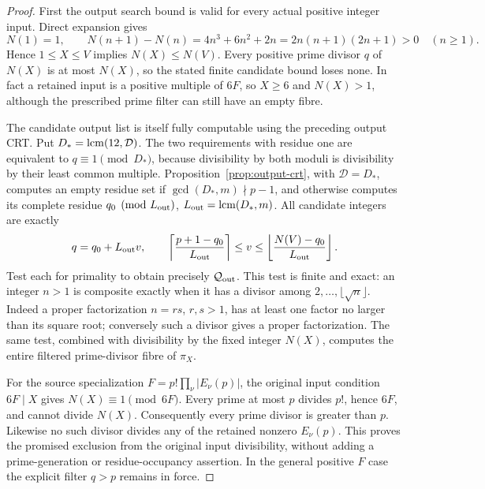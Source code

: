 \begin{proof}
First the output search bound is valid for every actual positive
integer input.  Direct expansion gives
\[
 N(1)=1,\qquad
 N(n+1)-N(n)=4n^3+6n^2+2n=2n(n+1)(2n+1)>0
 \quad(n\ge1).
\]
Hence \(1\le X\le V\) implies \(N(X)\le N(V)\).
Every positive prime divisor \(q\) of \(N(X)\) is at most
\(N(X)\), so the stated finite candidate bound loses none.
In fact a retained input is a positive multiple of \(6F\),
so \(X\ge6\) and \(N(X)>1\), although the prescribed prime
filter can still have an empty fibre.

The candidate output list is itself fully computable using the
preceding output CRT.  Put
\(D_*=\operatorname{lcm}(12,\mathcal D)\).
The two requirements with residue one are equivalent to
\(q\equiv1\pmod{D_*}\), because divisibility by both moduli is
divisibility by their least common multiple.
Proposition~\ref{prop:output-crt}, with \(\mathcal D=D_*\),
computes an empty residue set if
\(\gcd(D_*,m)\nmid p-1\), and otherwise computes its complete
residue \(q_0\pmod{L_{\rm out}}\),
\(L_{\rm out}=\operatorname{lcm}(D_*,m)\).
All candidate integers are exactly
\[
 q=q_0+L_{\rm out}v,\qquad
 \left\lceil\frac{p+1-q_0}{L_{\rm out}}\right\rceil
 \le v\le
 \left\lfloor\frac{N(V)-q_0}{L_{\rm out}}\right\rfloor.
\]
Test each for primality to obtain precisely \(\mathcal Q_{\rm out}\).
This test is finite and exact: an integer \(n>1\) is composite
exactly when it has a divisor among
\(2,\ldots,\lfloor\sqrt n\rfloor\).
Indeed a proper factorization \(n=rs\), \(r,s>1\), has at least
one factor no larger than its square root; conversely such a
divisor gives a proper factorization.  The same test, combined
with divisibility by the fixed integer \(N(X)\), computes the
entire filtered prime-divisor fibre of \(\pi_X\).

For the source specialization \(F=p!\prod_\nu|E_\nu(p)|\),
the original input condition \(6F\mid X\) gives
\(N(X)\equiv1\pmod{6F}\).  Every prime at most \(p\)
divides \(p!\), hence \(6F\), and cannot divide \(N(X)\).
Consequently every prime divisor is greater than \(p\).
Likewise no such divisor divides any of the retained nonzero
\(E_\nu(p)\).  This proves the promised exclusion from the
original input divisibility, without adding a prime-generation
or residue-occupancy assertion.  In the general positive \(F\)
case the explicit filter \(q>p\) remains in force.


\end{proof}
